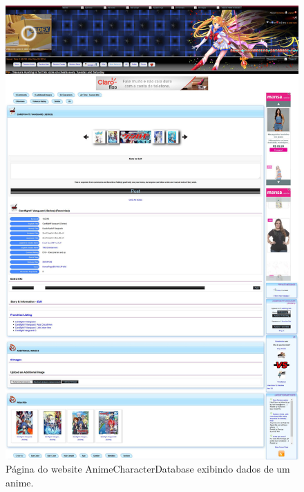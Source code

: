 \documentclass[12pt]{article}
\begin{document}
\begin{figure}[H]
\centering
\includegraphics[width=1\textwidth]{Cardfight.pdf}
\caption{Página do website AnimeCharacterDatabase exibindo dados de um anime.} \label{collection}
\end{figure}
\end{document}
